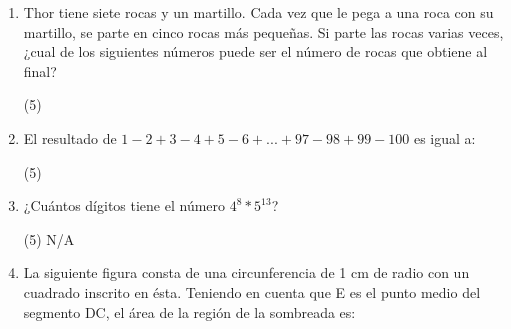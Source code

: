 \documentclass{article}
\begin{document}
\begin{enumerate}
{          %
        }
    \item Thor tiene siete rocas y un martillo. Cada vez que le pega a una roca con su martillo, se parte en cinco rocas más pequeñas. Si parte las rocas varias veces, ¿cual de los siguientes números puede ser el número de rocas que obtiene al final? \\ \begin{tasks}[label=\Alph*.](5)
          \end{tasks}
    \item El resultado de $1-2+3-4+5-6+...+97-98+99-100$ es igual a: \\ \begin{tasks}[label=\Alph*.](5)
          \end{tasks}
    \item ¿Cuántos dígitos tiene el número $4^8 * 5^{13}$? \\ \begin{tasks}[label=\Alph*.](5)
              \task N/A
          \end{tasks}
    \item{La siguiente figura consta de una circunferencia de 1 cm de radio con un cuadrado inscrito en ésta. Teniendo en cuenta que E es el punto medio del segmento DC, el área de la región de la sombreada es: \\ \begin{center} 
\end{center}}
\end{enumerate}
\end{document}
